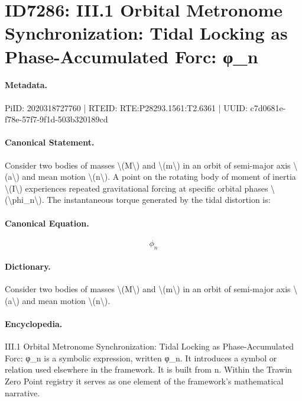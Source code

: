 \section*{ID7286: III.1 Orbital Metronome Synchronization: Tidal Locking as Phase-Accumulated Forc: φ\_n}
\paragraph{Metadata.}
PiID: 2020318727760 | RTEID: RTE:P28293.1561:T2.6361 | UUID: c7d0681e-f78e-57f7-9f1d-503b320189cd

\paragraph{Canonical Statement.}
Consider two bodies of masses \textbackslash{}(M\textbackslash{}) and \textbackslash{}(m\textbackslash{}) in an orbit of semi-major axis \textbackslash{}(a\textbackslash{}) and mean motion \textbackslash{}(n\textbackslash{}). A point on the rotating body of moment of inertia \textbackslash{}(I\textbackslash{}) experiences repeated gravitational forcing at specific orbital phases \textbackslash{}(\textbackslash{}phi\_n\textbackslash{}). The instantaneous torque generated by the tidal distortion is:

\paragraph{Canonical Equation.}
\[
\phi_n
\]

\paragraph{Dictionary.}
Consider two bodies of masses \textbackslash{}(M\textbackslash{}) and \textbackslash{}(m\textbackslash{}) in an orbit of semi-major axis \textbackslash{}(a\textbackslash{}) and mean motion \textbackslash{}(n\textbackslash{}).

\paragraph{Encyclopedia.}
III.1 Orbital Metronome Synchronization: Tidal Locking as Phase-Accumulated Forc: φ\_n is a symbolic expression, written φ\_n. It introduces a symbol or relation used elsewhere in the framework. It is built from n. Within the Trawin Zero Point registry it serves as one element of the framework's mathematical narrative.
